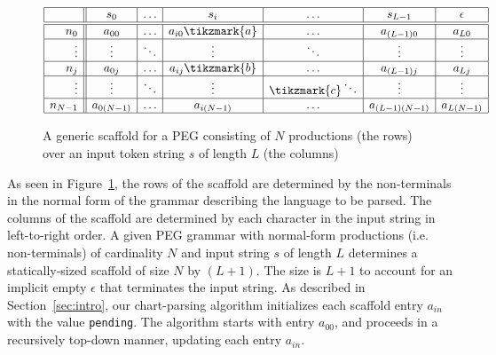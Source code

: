  \begin{figure}[h!]
 \[
 \begin{array}{|r||c|c|c|c|c|c|}\hline
   & s_{0} & \ldots & s_{i} & \ldots & s_{L - 1} & \epsilon \\\hline\hline
   n_{0} & a_{00}& \ldots & a_{i0}\tikzmark{a} & \ldots & a_{(L - 1)0} & a_{L0}\\\hline
   \vdots & \vdots & \ddots & \vdots & \ddots & \vdots& \vdots \\\hline
   n_{j} & a_{0j} & \ldots & a_{ij}\tikzmark{b} & \ldots & a_{(L - 1)j} & a_{Lj} \\\hline
   \vdots & \vdots & \ddots & \vdots & \tikzmark{c}\ddots & \vdots & \vdots \\\hline  
   n_{N - 1} & a_{0(N - 1)}& \ldots & a_{i(N - 1)} & \ldots & a_{(L - 1)(N - 1)} & a_{L(N - 1)} \\\hline
 \end{array}
 \]
 \vspace*{-4mm}
 \caption{\small A generic scaffold for a PEG consisting of $N$ productions (the rows) over an input token string $s$ of length $L$ (the columns)}
 \label{fig:GenericScaffold}
 \end{figure}

 As seen in Figure~\ref{fig:GenericScaffold}, the rows of the scaffold are determined by the non-terminals in the normal form of the grammar describing the language to be parsed. The columns of the scaffold are determined by each character in the input string in left-to-right order. A given PEG grammar with normal-form productions (i.e. non-terminals) of cardinality $N$ and input string $s$ of length $L$ determines a statically-sized scaffold of size $N$ by $(L + 1)$. The size is $L + 1$ to account for an implicit empty $\epsilon$ that terminates the input string.  As described in Section~\ref{sec:intro}, our chart-parsing algorithm initializes each scaffold entry $a_{in}$ with the value \texttt{pending}. The algorithm starts with entry $a_{00}$, and proceeds in a recursively top-down manner, updating each entry $a_{in}$.


